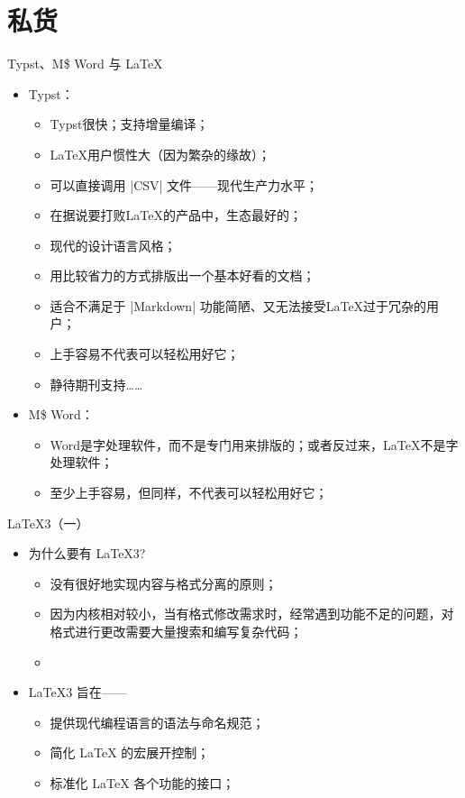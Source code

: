 \section{私货}
\begin{frame}[fragile]{Typst、M\$ Word 与 \LaTeX{}}
	\begin{itemize}
		\item<+-> Typst：
			\begin{itemize}
				\item Typst很快；支持增量编译；
				\item \LaTeX{}用户惯性大（因为繁杂的缘故）；
				\item 可以直接调用 |CSV| 文件——现代生产力水平；
				\item 在据说要打败\LaTeX{}的产品中，生态最好的；
				\item 现代的设计语言风格；
				\item 用比较省力的方式排版出一个基本好看的文档；
				\item 适合不满足于 |Markdown| 功能简陋、又无法接受\LaTeX{}过于冗杂的用户；
				\item 上手容易不代表可以轻松用好它；
				\item 静待期刊支持……
			\end{itemize}
		\item<+-> M\$ Word：
			\begin{itemize}
				\item Word是字处理软件，而不是专门用来排版的；或者反过来，\LaTeX{}不是字处理软件；
				\item 至少上手容易，但同样，不代表可以轻松用好它；
			\end{itemize}
	\end{itemize}
\end{frame}

\begin{frame}{\LaTeX{}3（一）}
	\begin{itemize}
		\item<+-> 为什么要有 \LaTeX{}3?
			\begin{itemize}
				\item \LaTeXe{} 没有很好地实现内容与格式分离的原则；
				\item 因为内核相对较小，当有格式修改需求时，经常遇到功能不足的问题，对格式进行更改需要大量搜索和编写复杂代码；
				\item {}
			\end{itemize}
		\item<+-> \LaTeX{}3 旨在——
			\begin{itemize}
				\item 提供现代编程语言的语法与命名规范；
				\item 简化 \LaTeX{} 的宏展开控制；
				\item 标准化 \LaTeX{} 各个功能的接口；
			\end{itemize}
	\end{itemize}
\end{frame}

